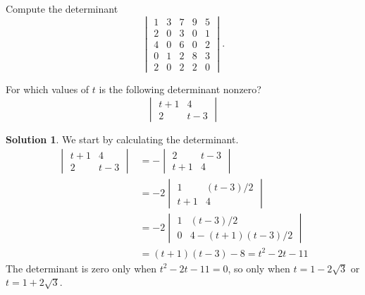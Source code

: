 \documentclass[12pt,a4paper]{article}
\theoremstyle{definition}
\newtheorem*{solution}{Solution} %
\begin{document}
\begin{question}
	Compute the determinant
	\[ \begin{vmatrix}
    	1 & 3 & 7 & 9 & 5 \\
    	2 & 0 & 3 & 0 & 1 \\
    	4 & 0 & 6 & 0 & 2 \\
    	0 & 1 & 2 & 8 & 3 \\
    	2 & 0 & 2 & 2 & 0 
    	\end{vmatrix}. \]
\end{question}

\begin{question}
For which values of $t$ is the following determinant nonzero?
$$\begin{vmatrix} t+1 & 4 \\ 2 & t-3\end{vmatrix}$$

\end{question}

\begin{solution}
We start by calculating the determinant. 
\begin{align*}
    \begin{vmatrix} t+1 & 4 \\ 2 & t-3\end{vmatrix} &= -\begin{vmatrix}  2 & t-3\\ t+1 & 4 \end{vmatrix}\\
    &= -2\begin{vmatrix}  1 & (t-3)/2\\ t+1 & 4 \end{vmatrix}\\
    &=-2\begin{vmatrix}  1 & (t-3)/2\\ 0 & 4-(t+1)(t-3)/2 \end{vmatrix}\\
    &=(t+1)(t-3)-8=t^2-2t-11
\end{align*}
The determinant is zero only when $t^2-2t-11=0$, so only when $t=1-2\sqrt{3}$ or $t=1+2\sqrt{3}$.
\end{solution}


\newpage
\end{document}
